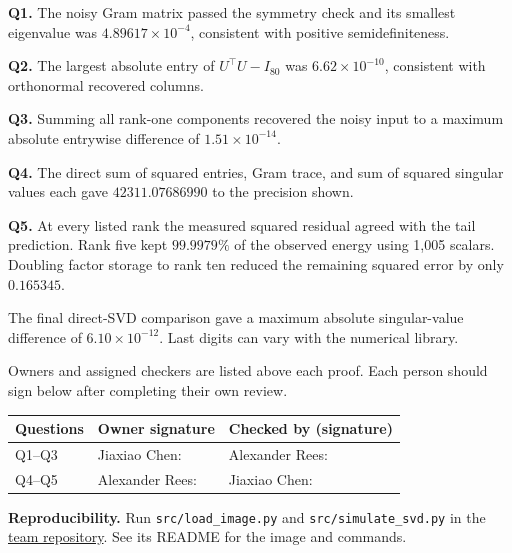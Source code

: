 \documentclass[11pt,letterpaper]{article}
\newcommand{\subhead}[1]{\par\medskip{\large\bfseries\color{accent}#1}\par}
\begin{document}
\textbf{Q1.} The noisy Gram matrix passed the symmetry check and its smallest eigenvalue was $4.89617\times10^{-4}$, consistent with positive semidefiniteness.\par
\textbf{Q2.} The largest absolute entry of $U^\top U-I_{80}$ was $6.62\times10^{-10}$, consistent with orthonormal recovered columns.\par
\textbf{Q3.} Summing all rank-one components recovered the noisy input to a maximum absolute entrywise difference of $1.51\times10^{-14}$.\par
\textbf{Q4.} The direct sum of squared entries, Gram trace, and sum of squared singular values each gave $42311.07686990$ to the precision shown.\par
\textbf{Q5.} At every listed rank the measured squared residual agreed with the tail prediction. Rank five kept $99.9979\%$ of the observed energy using 1,005 scalars. Doubling factor storage to rank ten reduced the remaining squared error by only $0.165345$.\par
The final direct-SVD comparison gave a maximum absolute singular-value difference of $6.10\times10^{-12}$. Last digits can vary with the numerical library.
\subhead{Team review record}\label{review}
Owners and assigned checkers are listed above each proof. Each person should sign below after completing their own review.
\begin{center}
\begin{tabularx}{\linewidth}{@{}lXX@{}}\toprule
Questions & Owner signature & Checked by (signature)\\\midrule
Q1--Q3 & Jiaxiao Chen: \hrulefill & Alexander Rees: \hrulefill\\[5pt]
Q4--Q5 & Alexander Rees: \hrulefill & Jiaxiao Chen: \hrulefill\\\bottomrule
\end{tabularx}
\end{center}
{\small\textbf{Reproducibility.} Run \texttt{src/load\_image.py} and \texttt{src/simulate\_svd.py} in the \href{https://github.com/Alexander-Rees/DS5020-SVD-Image-Compression}{team repository}. See its README for the image and commands.}
\end{document}
